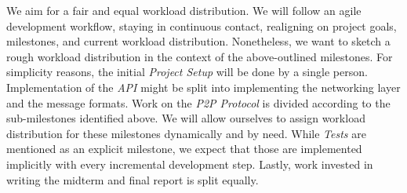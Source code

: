 \documentclass[a4paper, 11pt]{article}
\begin{document}
    We aim for a fair and equal workload distribution.
    We will follow an agile development workflow, staying in continuous contact, realigning on project goals, milestones, and
    current workload distribution.
    Nonetheless, we want to sketch a rough workload distribution in the context of the above-outlined milestones.
    For simplicity reasons, the initial \textit{Project Setup} will be done by a single person.
    Implementation of the \textit{API} might be split into implementing the networking layer and the message formats.
    Work on the \textit{P2P Protocol} is divided according to the sub-milestones identified above.
    We will allow ourselves to assign workload distribution for these milestones dynamically and by need.
    While \textit{Tests} are mentioned as an explicit milestone, we expect that those are implemented implicitly with every incremental development step.
    Lastly, work invested in writing the midterm and final report is split equally.
\end{document}
